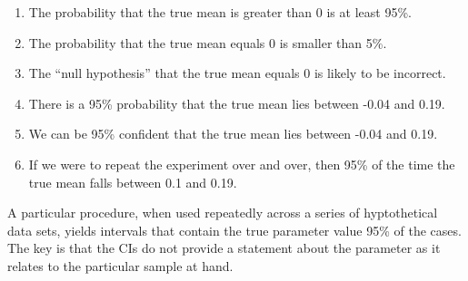 \documentclass[
  letterpaper,
  DIV=11,
  numbers=noendperiod]{scrreprt}
\providecommand{\tightlist}{%
  \setlength{\itemsep}{0pt}\setlength{\parskip}{0pt}}\usepackage{longtable,booktabs,array}
\begin{document}
\begin{tcolorbox}[enhanced jigsaw, colframe=quarto-callout-important-color-frame, left=2mm, toprule=.15mm, colbacktitle=quarto-callout-important-color!10!white, title=\textcolor{quarto-callout-important-color}{\faExclamation}\hspace{0.5em}{Incorrect interpretations:}, coltitle=black, rightrule=.15mm, leftrule=.75mm, colback=white, arc=.35mm, bottomtitle=1mm, bottomrule=.15mm, breakable, titlerule=0mm, opacitybacktitle=0.6, toptitle=1mm, opacityback=0]

\begin{enumerate}
\def\labelenumi{\arabic{enumi}.}
\tightlist
\item
  The probability that the true mean is greater than 0 is at least 95\%.
\item
  The probability that the true mean equals 0 is smaller than 5\%.
\item
  The ``null hypothesis'' that the true mean equals 0 is likely to be
  incorrect.
\item
  There is a 95\% probability that the true mean lies between -0.04 and
  0.19.
\item
  We can be 95\% confident that the true mean lies between -0.04 and
  0.19.
\item
  If we were to repeat the experiment over and over, then 95\% of the
  time the true mean falls between 0.1 and 0.19.
\end{enumerate}

\end{tcolorbox}

\begin{tcolorbox}[enhanced jigsaw, colframe=quarto-callout-tip-color-frame, left=2mm, toprule=.15mm, colbacktitle=quarto-callout-tip-color!10!white, title=\textcolor{quarto-callout-tip-color}{\faLightbulb}\hspace{0.5em}{Correct interpretations:}, coltitle=black, rightrule=.15mm, leftrule=.75mm, colback=white, arc=.35mm, bottomtitle=1mm, bottomrule=.15mm, breakable, titlerule=0mm, opacitybacktitle=0.6, toptitle=1mm, opacityback=0]

A particular procedure, when used repeatedly across a series of
hyptothetical data sets, yields intervals that contain the true
parameter value 95\% of the cases. The key is that the CIs do not
provide a statement about the parameter as it relates to the particular
sample at hand.

\end{tcolorbox}
\end{document}
